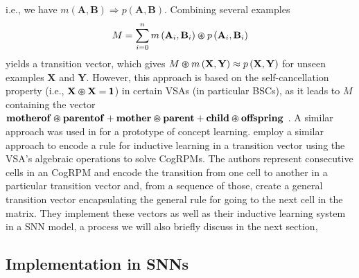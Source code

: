 i.e., we have $m\left(\mathbf{A}, \mathbf{B}\right) \Longrightarrow p\left(\mathbf{A}, \mathbf{B}\right)$.
Combining several examples
\begin{equation*}
	M = \sum_{i=0}^{n} m\left(\mathbf{A}_i, \mathbf{B}_i \right) \varoast p\left(\mathbf{A}_i, \mathbf{B}_i \right)
\end{equation*}
yields a transition vector, which gives $ M \varoast m \left(\mathbf{X}, \mathbf{Y} \right) \approx p \left(\mathbf{X}, \mathbf{Y} \right)$ for unseen examples $\mathbf{X}$ and $\mathbf{Y}$.
However, this approach is based on the self-cancellation property (i.e., $\mathbf{X} \varoast \mathbf{X} = \pmb{1}$) in certain \acp{VSA} (in particular  \acp{BSC}), as it leads to $M$ containing the vector $\mathbf{motherof} \varoast \mathbf{parentof} + \mathbf{mother} \varoast \mathbf{parent} + \mathbf{child} \varoast \mathbf{offspring}$ \parencite[see][for details]{Kanerva2000}.
A similar approach was used in \textcite{Kleyko2015a} for a prototype of concept learning.
\textcite{Rasmussen2011} employ a similar approach to encode a rule for inductive learning in a transition vector using the \ac{VSA}'s algebraic operations to solve \acp{CogRPM}.
The authors represent consecutive cells in an \ac{CogRPM} and encode the transition from one cell to another in a particular transition vector and, from a sequence of those, create a general transition vector encapsulating the general rule for going to the next cell in the matrix.
They implement these vectors as well as their inductive learning system in a \ac{SNN} model, a process we will also briefly discuss in the next section,

\subsection{Implementation in \aclp{SNN}}%
\label{subsec:implementation_in_snns}

